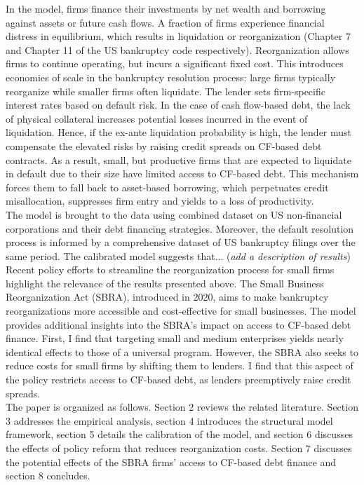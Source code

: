 \documentclass[12pt]{article}
\begin{document}
In the model, firms finance their investments by net wealth and borrowing against assets or future cash flows. A fraction of firms experience financial distress in equilibrium, which results in liquidation or reorganization (Chapter 7 and Chapter 11 of the US bankruptcy code respectively). Reorganization allows firms to continue operating, but incurs a significant fixed cost. This introduces economies of scale in the bankruptcy resolution process: large firms typically reorganize while smaller firms often liquidate. The lender sets firm-specific interest rates based on default risk. In the case of cash flow-based debt, the lack of physical collateral increases potential losses incurred in the event of liquidation. Hence, if the ex-ante liquidation probability is high, the lender must compensate the elevated risks by raising credit spreads on CF-based debt contracts. As a result, small, but productive firms that are expected to liquidate in default due to their size have limited access to CF-based debt. This mechanism forces them to fall back to asset-based borrowing, which perpetuates credit misallocation, suppresses firm entry and yields to a loss of productivity.   \vspace{3mm} \\
The model is brought to the data using combined dataset on US non-financial corporations and their debt financing strategies. Moreover, the default resolution process is informed by a comprehensive dataset of US bankruptcy filings over the same period. The calibrated model suggests that... (\textit{add a description of results}) \vspace{3mm} \\
Recent policy efforts to streamline the reorganization process for small firms highlight the relevance of the results presented above. The Small Business Reorganization Act (SBRA), introduced in 2020, aims to make bankruptcy reorganizations more accessible and cost-effective for small businesses. The model provides additional insights into the SBRA’s impact on access to CF-based debt finance. First, I find that targeting small and medium enterprises yields nearly identical effects to those of a universal program. However, the SBRA also seeks to reduce costs for small firms by shifting them to lenders. I find that this aspect of the policy restricts access to CF-based debt, as lenders preemptively raise credit spreads.  \vspace{3mm} \\
The paper is organized as follows. Section 2 reviews the related literature. Section 3 addresses the empirical analysis, section 4 introduces the structural model framework, section 5 details the calibration of the model, and section 6 discusses the effects of policy reform that reduces reorganization costs. Section 7 discusses the potential effects of the SBRA firms' access to CF-based debt finance and section 8 concludes.
\end{document}
